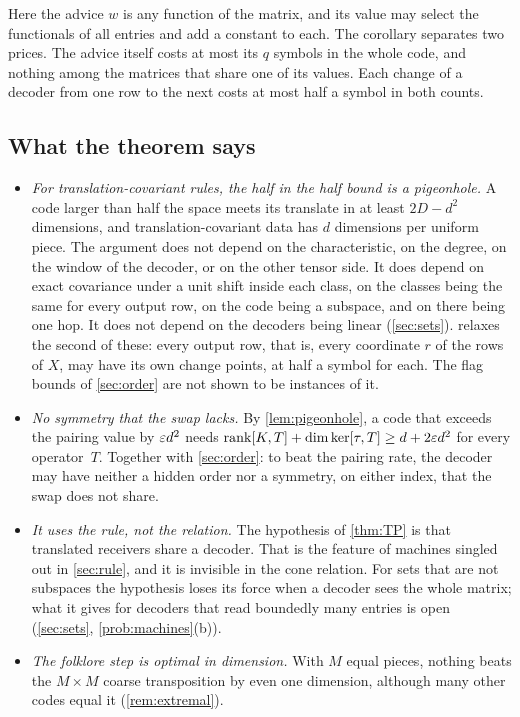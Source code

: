Here the advice $w$ is any function of the matrix, and its value may select the functionals of all entries and add a
constant to each. The corollary separates two prices. The advice itself costs at most its $q$ symbols in the whole
code, and nothing among the matrices that share one of its values. Each change of a decoder from one row to the next
costs at most half a symbol in both counts.

\subsection{What the theorem says}\label{sec:symmetry-says}

\begin{itemize}[leftmargin=1.5em]
\item \emph{For translation-covariant rules, the half in the half bound is a pigeonhole.} A code larger than half the
space meets its translate in at least $2D-d^2$ dimensions, and translation-covariant data has $d$ dimensions per uniform
piece. The argument does not depend on the characteristic, on the degree, on the window of the decoder, or on the other
tensor side. It does depend on exact covariance under a unit shift inside each class, on the classes being the same for
every output row, on the code being a subspace, and on there being one hop. It does not depend on the decoders being
linear (\cref{sec:sets}).  relaxes the second of these: every output
row, that is, every coordinate $r$ of the rows of $X$, may have its own change points, at half a symbol for each.
The flag bounds of \cref{sec:order} are not shown to be instances of it.
\item \emph{No symmetry that the swap lacks.} By \cref{lem:pigeonhole}, a code that exceeds the pairing value by
$\varepsilon d^2$ needs $\operatorname{rank}[K,T]+\dim\ker[\tau,T]\ge d+2\varepsilon d^2$ for every operator~$T$. Together with \cref{sec:order}:
to beat the pairing rate, the decoder may have neither a hidden order nor a symmetry, on either index, that the swap
does not share.
\item \emph{It uses the rule, not the relation.} The hypothesis of \cref{thm:TP} is that translated receivers share a
decoder. That is the feature of machines singled out in \cref{sec:rule}, and it is invisible in the cone relation.
For sets that are not subspaces the hypothesis loses its force when a decoder sees the whole matrix; what it gives
for decoders that read boundedly many entries is open (\cref{sec:sets}, \cref{prob:machines}(b)).
\item \emph{The folklore step is optimal in dimension.} With $M$ equal pieces, nothing beats the $M\times M$ coarse
transposition by even one dimension, although many other codes equal it (\cref{rem:extremal}).
\end{itemize}

